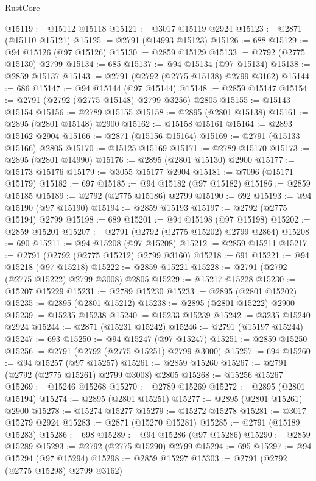 \begin{lexlean}{RustCore}
\begin{coremodule}
@15119 := @15112 @15118
@15121 := @3017 @15119 @2924
@15123 := @2871 (@15110 @15121)
@15125 := @2791 (@14993 @15123)
@15126 := 688
@15129 := @94 @15126 (@97 @15126)
@15130 := @2859 @15129
@15133 := @2792 (@2775 @15130) @2799
@15134 := 685
@15137 := @94 @15134 (@97 @15134)
@15138 := @2859 @15137
@15143 := @2791 (@2792 (@2775 @15138) @2799 @3162)
@15144 := 686
@15147 := @94 @15144 (@97 @15144)
@15148 := @2859 @15147
@15154 := @2791 (@2792 (@2775 @15148) @2799 @3256) @2805
@15155 := @15143 @15154
@15156 := @2789 @15155
@15158 := @2895 (@2801 @15138)
@15161 := @2895 (@2801 @15148) @2900
@15162 := @15158 @15161
@15164 := @2893 @15162 @2904
@15166 := @2871 (@15156 @15164)
@15169 := @2791 (@15133 @15166) @2805
@15170 := @15125 @15169
@15171 := @2789 @15170
@15173 := @2895 (@2801 @14990)
@15176 := @2895 (@2801 @15130) @2900
@15177 := @15173 @15176
@15179 := @3055 @15177 @2904
@15181 := @7096 (@15171 @15179)
@15182 := 697
@15185 := @94 @15182 (@97 @15182)
@15186 := @2859 @15185
@15189 := @2792 (@2775 @15186) @2799
@15190 := 692
@15193 := @94 @15190 (@97 @15190)
@15194 := @2859 @15193
@15197 := @2792 (@2775 @15194) @2799
@15198 := 689
@15201 := @94 @15198 (@97 @15198)
@15202 := @2859 @15201
@15207 := @2791 (@2792 (@2775 @15202) @2799 @2864)
@15208 := 690
@15211 := @94 @15208 (@97 @15208)
@15212 := @2859 @15211
@15217 := @2791 (@2792 (@2775 @15212) @2799 @3160)
@15218 := 691
@15221 := @94 @15218 (@97 @15218)
@15222 := @2859 @15221
@15228 := @2791 (@2792 (@2775 @15222) @2799 @3008) @2805
@15229 := @15217 @15228
@15230 := @15207 @15229
@15231 := @2789 @15230
@15233 := @2895 (@2801 @15202)
@15235 := @2895 (@2801 @15212)
@15238 := @2895 (@2801 @15222) @2900
@15239 := @15235 @15238
@15240 := @15233 @15239
@15242 := @3235 @15240 @2924
@15244 := @2871 (@15231 @15242)
@15246 := @2791 (@15197 @15244)
@15247 := 693
@15250 := @94 @15247 (@97 @15247)
@15251 := @2859 @15250
@15256 := @2791 (@2792 (@2775 @15251) @2799 @3000)
@15257 := 694
@15260 := @94 @15257 (@97 @15257)
@15261 := @2859 @15260
@15267 := @2791 (@2792 (@2775 @15261) @2799 @3008) @2805
@15268 := @15256 @15267
@15269 := @15246 @15268
@15270 := @2789 @15269
@15272 := @2895 (@2801 @15194)
@15274 := @2895 (@2801 @15251)
@15277 := @2895 (@2801 @15261) @2900
@15278 := @15274 @15277
@15279 := @15272 @15278
@15281 := @3017 @15279 @2924
@15283 := @2871 (@15270 @15281)
@15285 := @2791 (@15189 @15283)
@15286 := 698
@15289 := @94 @15286 (@97 @15286)
@15290 := @2859 @15289
@15293 := @2792 (@2775 @15290) @2799
@15294 := 695
@15297 := @94 @15294 (@97 @15294)
@15298 := @2859 @15297
@15303 := @2791 (@2792 (@2775 @15298) @2799 @3162)

\end{coremodule}
\end{lexlean}
